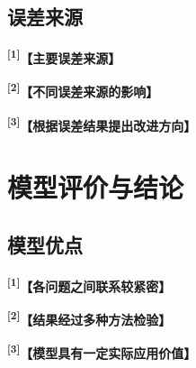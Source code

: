 \documentclass[UTF8,a4paper,12pt,fontset=fandol]{ctexart}
\newif\ifDraftAid
\newcommand{\ph}[1]{\textbf{\color{phg}【#1】}}
\newcommand{\detail}[1]{%
  \ifDraftAid\textnormal{\color{detailg}\small\,（参考写法：#1）}\fi}
\newcommand{\PHD}[2]{\ph{#1}\detail{#2}}
\newcommand{\SN}[1]{\textsuperscript{\color{noteg}\bfseries[#1]}}
\newcommand{\Note}[2]{\par\noindent\textbf{[#1]}\ #2}
\newcommand{\Annotated}[2]{%
\ifDraftAid
\noindent\begin{minipage}[t]{0.735\linewidth}\vspace{0pt}#1\end{minipage}\hfill
\begin{minipage}[t]{0.235\linewidth}\vspace{0pt}\footnotesize\color{noteg}\raggedright
\begin{tcolorbox}[colback=notebg,colframe=ruleg,boxrule=0.35pt,arc=1mm,left=1.2mm,right=1.2mm,top=1mm,bottom=1mm]
#2
\end{tcolorbox}\end{minipage}
\else
#1
\fi
}
\numberwithin{figure}{section}
\numberwithin{table}{section}
\begin{document}
\subsection{误差来源}
\Annotated{
\SN{1}\PHD{主要误差来源}{模型误差主要来自三个方面：一是〔测量噪声、缺失或采样不足〕带来的数据误差；二是建立模型时对〔实际过程〕所作简化造成的模型误差；三是〔待估参数〕的取值误差。}

\par\medskip
\SN{2}\PHD{不同误差来源的影响}{通过〔残差分析、参数扰动或重复采样〕比较不同因素的影响。结果显示，〔误差源A〕变化时〔指标〕变化约为〔数值A〕，〔误差源B〕对应变化约为〔数值B〕，因此〔误差源A〕是当前结果中较主要的误差来源。}

\par\medskip
\SN{3}\PHD{根据误差结果提出改进方向}{由上述结果可知，若进一步提高模型精度，应优先改善〔最主要误差来源对应的数据或方法〕。对于影响较小的〔其他因素〕，继续增加模型复杂度对总体结果的改善可能有限。}
}{
\Note{1}{误差分析从数据、模型假设和参数估计等具体来源展开。}
\Note{2}{若无法精确计算各项误差，可根据实验结果比较其相对影响。}
\Note{3}{根据主要误差来源提出相应改进方向。}
}

\section{模型评价与结论}
\subsection{模型优点}
\Annotated{
\SN{1}\PHD{各问题之间联系较紧密}{本文各问题之间具有较强的连续性：问题一得到的〔特征或指标〕用于问题二建模，问题二所得〔模型〕继续用于问题三，问题三的结果又作为问题四分析的基础，使前后各部分能够相互衔接，确保了研究方案的整体性和严谨性。}

\par\medskip
\SN{2}\PHD{结果经过多种方法检验}{模型结果不仅通过〔测试集或交叉验证〕进行评价，还利用〔消融、灵敏度或对照实验〕分析模型变化，并结合〔实际规律或外部资料〕进行比较。通过多项评价指标的验证，所有模型在不同评价标准上均表现出较高的准确性，证明了该模型在〔任务〕中的适用性和有效性。}

\par\medskip
\SN{3}\PHD{模型具有一定实际应用价值}{本文模型主要使用〔现实中可以获得的数据〕，求解过程所需〔时间或计算资源〕为〔数量级〕，最终得到〔数值、类别、路径或方案〕。在题目所给应用场景下，模型具有一定的实际应用价值，为〔实际任务〕提供了可靠的技术支持。}
}{
\Note{1}{模型优点尽量引用正文已经得到的结果。}
\Note{2}{不要只写“精度高”，可从数据处理、模型结果和适用性等方面概括。}
\Note{3}{若讨论应用价值，可结合数据获取条件和计算量说明。}
}
\end{document}
